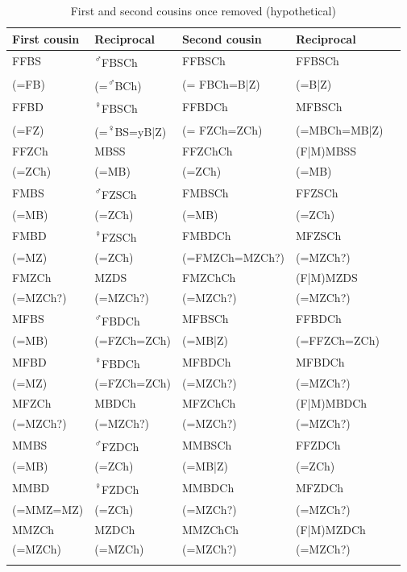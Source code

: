 \begin{table}
\caption{First and second cousins once removed (hypothetical)} \label{sec:cousin.once}
\begin{tabular}{lllll}
\lsptoprule
First cousin  & Reciprocal & Second cousin &  Reciprocal \\ 
\midrule
FFBS  & \textsuperscript{♂}FBSCh  & FFBSCh  & FFBSCh \\
(=FB)& (=\textsuperscript{♂}BCh) &(= FBCh=B|Z)& (=B|Z) \\
\midrule
FFBD & \textsuperscript{♀}FBSCh& FFBDCh  & MFBSCh  \\
 (=FZ) & (=\textsuperscript{♀}BS=yB|Z) &  (= FZCh=ZCh) &  (=MBCh=MB|Z) \\
\midrule
FFZCh   & MBSS  & FFZChCh   & (F|M)MBSS   \\
(=ZCh) &  (=MB) &  (=ZCh) & (=MB) \\
\midrule
FMBS  & \textsuperscript{♂}FZSCh   & FMBSCh  &  FFZSCh  \\
 (=MB) & (=ZCh) &  (=MB) &   (=ZCh) \\
 \midrule
FMBD   & \textsuperscript{♀}FZSCh   & FMBDCh  &  MFZSCh  \\
 (=MZ) &  (=ZCh) &  (=FMZCh=MZCh?)\grise{} &   (=MZCh?) \grise{}\\
\midrule
FMZCh   & MZDS   & FMZChCh  &  (F|M)MZDS  \\
 (=MZCh?)\grise{} &  (=MZCh?)\grise{}&  (=MZCh?)\grise{}&  (=MZCh?)\grise{} \\
\midrule
MFBS  & \textsuperscript{♂}FBDCh &MFBSCh & FFBDCh  \\
 (=MB) & (=FZCh=ZCh) & (=MB|Z)&  (=FFZCh=ZCh) \\
 \midrule
MFBD & \textsuperscript{♀}FBDCh &MFBDCh & MFBDCh  \\
 (=MZ) & (=FZCh=ZCh) & (=MZCh?)\grise{}&  (=MZCh?)\grise{} \\
\midrule
MFZCh  &  MBDCh &MFZChCh & (F|M)MBDCh  \\
 (=MZCh?)\grise{} &  (=MZCh?)\grise{}&  (=MZCh?)\grise{}&  (=MZCh?)\grise{} \\
 \midrule
 MMBS  & \textsuperscript{♂}FZDCh &MMBSCh & FFZDCh  \\
 (=MB) & (=ZCh) & (=MB|Z)&  (=ZCh) \\
  \midrule
  MMBD  & \textsuperscript{♀}FZDCh &MMBDCh & MFZDCh  \\
 (=MMZ=MZ) & (=ZCh) & (=MZCh?)\grise{} &  (=MZCh?) \grise{} \\
   \midrule
  MMZCh  & MZDCh &MMZChCh & (F|M)MZDCh  \\
   (=MZCh) &  (=MZCh) &  (=MZCh?) \grise{}&  (=MZCh?)\grise{} \\
\lspbottomrule
\end{tabular}
\end{table}
 